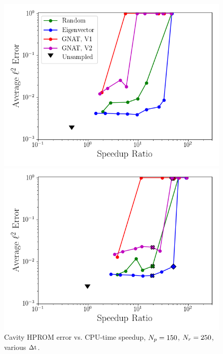 \begin{figure}
	\begin{minipage}{0.49\linewidth}
		\includegraphics[width=0.99\linewidth]{Chapters/CavityAndCVRC/Images/cavity/deim/sampled_dt2p5e-6_Average_errorRaw_pareto.png}
		\subcaption{$\dt = 2.5 \times \dtFOM$}
	\end{minipage}
	\begin{minipage}{0.49\linewidth}
		\includegraphics[width=0.99\linewidth]{Chapters/CavityAndCVRC/Images/cavity/deim/sampled_dt5e-6_Average_errorRaw_pareto.png}
		\subcaption{$\dt = 5 \times \dtFOM$}
	\end{minipage}
	\caption{\label{fig:cavitySampledROMErrVsTime}Cavity HPROM error vs. CPU-time speedup, $N_p = 150$, $N_r = 250$, various $\Delta \text{t}$.}
\end{figure}

